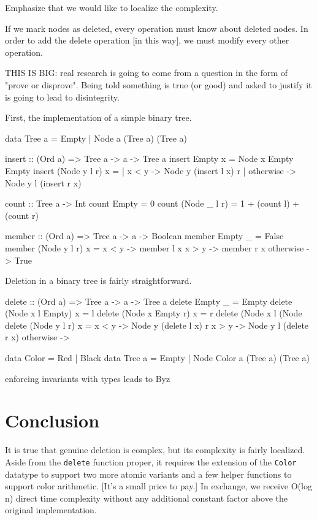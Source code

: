 \documentclass[preprint]{sigplanconf}
\begin{document}
Emphasize that we would like to localize the complexity.

If we mark nodes as deleted, every operation must know about deleted nodes.
In order to add the delete operation [in this way], we must modify every 
other operation.

THIS IS BIG: real research is going to come from a question in the form of
"prove or disprove". Being told something is true (or good) and asked to 
justify it is going to lead to disintegrity.

First, the implementation of a simple binary tree.

data Tree a = Empty | Node a (Tree a) (Tree a)

insert :: (Ord a) => Tree a -> a -> Tree a
insert Empty x = Node x Empty Empty
insert (Node y l r) x = | x < y     -> Node y (insert l x) r
                        | otherwise -> Node y l (insert r x)

count :: Tree a -> Int
count Empty = 0
count (Node \_ l r) = 1 + (count l) + (count r)

member :: (Ord a) => Tree a -> a -> Boolean
member Empty \_ = False
member (Node y l r) x = x < y     -> member l x
                        x > y     -> member r x
                        otherwise -> True

Deletion in a binary tree is fairly straightforward.

delete :: (Ord a) => Tree a -> a -> Tree a
delete Empty \_ = Empty
delete (Node x l Empty) x = l
delete (Node x Empty r) x = r
delete (Node x l (Node
delete (Node y l r) x = x < y     -> Node y (delete l x) r
                        x > y     -> Node y l (delete r x)
                        otherwise ->

data Color = Red | Black
data Tree a = Empty | Node Color a (Tree a) (Tree a)

enforcing invariants with types leads to Byz

\section{Conclusion}
It is true that genuine deletion is complex, but its complexity is fairly localized. Aside from the \texttt{delete} function proper, it requires the extension of the \texttt{Color} datatype to support two more atomic variants and a few helper functions to support color arithmetic. [It's a small price to pay.] In exchange, we receive O(log n) direct time complexity without any additional constant factor above the original implementation.
\end{document}
